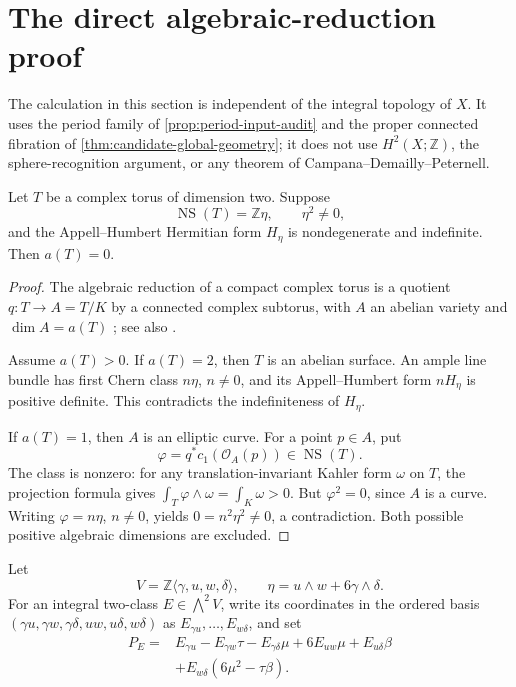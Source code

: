\section{The direct algebraic-reduction proof}
\label{sec:algebraic-dimension}

The calculation in this section is independent of the integral topology of
\(X\).  It uses the period family of
\cref{prop:period-input-audit} and the proper connected fibration of
\cref{thm:candidate-global-geometry}; it does not use \(H^2(X;\mathbb Z)\),
the sphere-recognition argument, or any theorem of
Campana--Demailly--Peternell.

\begin{lemma}
\label{lem:torus-algebraic-reduction-audit}
Let \(T\) be a complex torus of dimension two.  Suppose
\[
 \operatorname{NS}(T)=\mathbb Z\eta,\qquad \eta^2\ne0,
\]
and the Appell--Humbert Hermitian form \(H_\eta\) is nondegenerate and
indefinite.  Then \(a(T)=0\).
\end{lemma}

\begin{proof}
The algebraic reduction of a compact complex torus is a quotient
\(q:T\to A=T/K\) by a connected complex subtorus, with \(A\) an abelian
variety and \(\dim A=a(T)\)
\cite[Chapter~2, \S6]{BirkenhakeLange1999}; see also
\cite[\S8, p.~2437]{PareschiPopaSchnell2017}.

Assume \(a(T)>0\).  If \(a(T)=2\), then \(T\) is an abelian surface.  An
ample line bundle has first Chern class \(n\eta\), \(n\ne0\), and its
Appell--Humbert form \(nH_\eta\) is positive definite.  This contradicts
the indefiniteness of \(H_\eta\).

If \(a(T)=1\), then \(A\) is an elliptic curve.  For a point \(p\in A\),
put
\[
 \varphi=q^*c_1(\mathcal O_A(p))\in\operatorname{NS}(T).
\]
The class is nonzero: for any translation-invariant Kahler form \(\omega\)
on \(T\), the projection formula gives
\(\int_T\varphi\wedge\omega=\int_K\omega>0\).  But
\(\varphi^2=0\), since \(A\) is a curve.  Writing
\(\varphi=n\eta\), \(n\ne0\), yields
\(0=n^2\eta^2\ne0\), a contradiction.  Both possible positive algebraic
dimensions are excluded.
\end{proof}

Let
\[
 V=\mathbb Z\langle\gamma,u,w,\delta\rangle,
 \qquad
 \eta=u\wedge w+6\gamma\wedge\delta.
\]
For an integral two-class \(E\in\bigwedge^2V\), write its coordinates in
the ordered basis
\((\gamma u,\gamma w,\gamma\delta,uw,u\delta,w\delta)\) as
\(E_{\gamma u},\ldots,E_{w\delta}\), and set
\[
\begin{aligned}
P_E={}&E_{\gamma u}-E_{\gamma w}\tau-E_{\gamma\delta}\mu
 +6E_{uw}\mu+E_{u\delta}\beta\\
&+E_{w\delta}(6\mu^2-\tau\beta).
\end{aligned}
\tag{3.1}
\]

